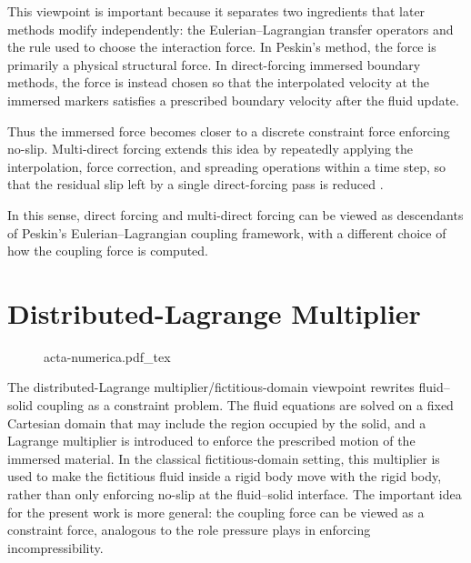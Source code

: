 This viewpoint is important because it separates two ingredients that later
methods modify independently: the Eulerian--Lagrangian transfer operators and
the rule used to choose the interaction force. In Peskin's method, the force is
primarily a physical structural force. In direct-forcing immersed boundary
methods, the force is instead chosen so that the interpolated velocity at the
immersed markers satisfies a prescribed boundary velocity after the fluid
update\cite{uhlmann_immersed_2005,fadlun_combined_2000}.

Thus the immersed force becomes closer to a discrete constraint force enforcing
no-slip. Multi-direct forcing extends this idea by repeatedly applying the
interpolation, force correction, and spreading operations within a time step,
so that the residual slip left by a single direct-forcing pass is reduced
\cite{wang_combined_2008}.

In this sense, direct forcing and multi-direct forcing can be viewed as
descendants of Peskin's Eulerian--Lagrangian coupling framework, with a
different choice of how the coupling force is computed.

\section{Distributed-Lagrange Multiplier}

\begin{figure}[H]
    \centering
    {acta-numerica.pdf_tex}
    \caption{}
    \label{fig:immersed-boundary}
\end{figure}

The distributed-Lagrange multiplier/fictitious-domain viewpoint rewrites
fluid--solid coupling as a constraint problem. The fluid equations are solved
on a fixed Cartesian domain that may include the region occupied by the solid,
and a Lagrange multiplier is introduced to enforce the prescribed motion of the
immersed material. In the classical fictitious-domain setting, this multiplier
is used to make the fictitious fluid inside a rigid body move with the rigid
body, rather than only enforcing no-slip at the fluid--solid interface. The
important idea for the present work is more general: the coupling force can be
viewed as a constraint force, analogous to the role pressure plays in enforcing
incompressibility.

